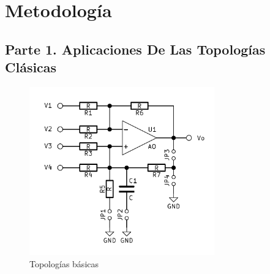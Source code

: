 \section{Metodología}\label{sec:metodologia}
\subsection{Parte 1. Aplicaciones De Las Topologías Clásicas}

\begin{figure}[H]
  \centering
  \includegraphics[width=8cm]{Imagenes/topologias_basicas.png}
  \caption{Topologías básicas}
  \label{fig:topologia_basicas}
\end{figure}

